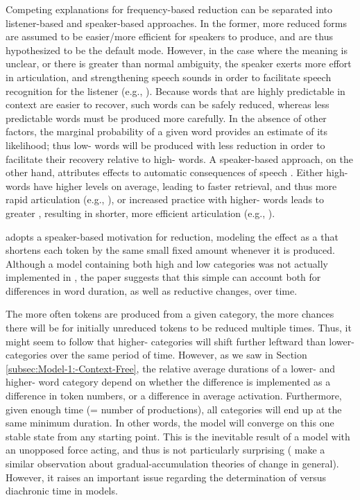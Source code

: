 Competing explanations for frequency-based reduction can be separated
into listener-based and speaker-based approaches. In the former, more
reduced forms are assumed to be easier/more efficient for speakers
to produce, and are thus hypothesized to be the default 
mode. However, in the case where the meaning is unclear, or there
is greater than normal ambiguity, the speaker exerts more effort in
articulation,  and strengthening speech sounds in order
to facilitate speech recognition for the listener (e.g., \citealp{Aylett2004}).
Because words that are highly predictable in context are easier to
recover, such words can be safely reduced, whereas less predictable
words must be produced more carefully. In the absence of other factors,
the marginal probability of a given word provides an estimate of its
likelihood; thus low- words will be produced with less reduction
in order to facilitate their recovery relative to high- words.
A speaker-based approach, on the other hand, attributes 
effects to automatic consequences of speech . Either high-
words have higher  levels on average, leading to
faster retrieval, and thus more rapid articulation (e.g., \citealt{gahl2012reduce}),
or increased practice with higher- words leads to greater
, resulting in shorter, more efficient articulation (e.g.,
\citealt{Bybee2002}).

\citet{Pierrehumbert2000} adopts a speaker-based motivation for reduction,
modeling the effect as a   that shortens each token
by the same small fixed amount whenever it is produced. Although a
model containing both high and low  categories was not actually
implemented in \citet{Pierrehumbert2000}, the paper suggests that
this simple  can account both for  differences in word
duration, as well as reductive changes, over time. 

The more often tokens are produced from a given category, the more
chances there will be for initially unreduced tokens to be reduced
multiple times. Thus, it might seem to follow that higher-
categories will shift further leftward than lower- categories
over the same period of time. However, as we saw in Section \ref{subsec:Model-1:-Context-Free},
the relative average durations of a lower- and higher-  word
category depend on whether the  difference is implemented as a difference in token numbers, or a difference in average activation. Furthermore, given
enough time (= number of productions), all categories will end up
at the same minimum duration. In other words, the model will converge
on this one stable state from any starting point. This is the inevitable
result of a model with an unopposed force acting, and thus is not
particularly surprising (\citealt{Baker2011} make a similar observation
about gradual-accumulation theories of change in general). However,
it raises an important issue regarding the determination of 
versus diachronic time in  models. 

